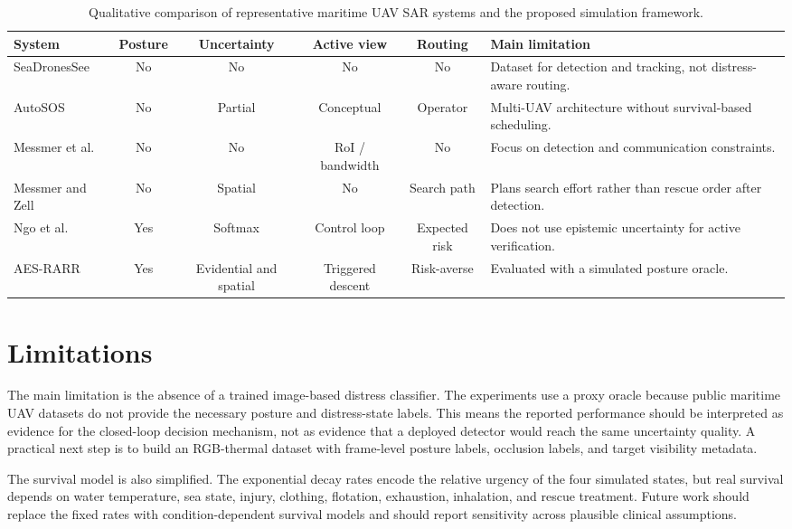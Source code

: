 \documentclass[runningheads]{llncs}
\newcommand{\aes}{AES-RARR}
\begin{document}
\begin{table}[p]
\centering
\caption{Qualitative comparison of representative maritime UAV SAR systems and the proposed simulation framework.}
\label{tab:comparison}
\scriptsize
\setlength{\tabcolsep}{2.5pt}
\renewcommand{\arraystretch}{1.05}
\begin{tabularx}{\textwidth}{p{2.15cm}CCCCY}
\toprule
\textbf{System} & \textbf{Posture} & \textbf{Uncertainty} & \textbf{Active view} & \textbf{Routing} & \textbf{Main limitation} \\
\midrule
SeaDronesSee \cite{varga2022seadronessee} & No & No & No & No & Dataset for detection and tracking, not distress-aware routing. \\
AutoSOS \cite{queralta2020} & No & Partial & Conceptual & Operator & Multi-UAV architecture without survival-based scheduling. \\
Messmer et al. \cite{messmer2024holistic} & No & No & RoI / bandwidth & No & Focus on detection and communication constraints. \\
Messmer and Zell \cite{messmer2024planning} & No & Spatial & No & Search path & Plans search effort rather than rescue order after detection. \\
Ngo et al. \cite{ngo2026drowning} & Yes & Softmax & Control loop & Expected risk & Does not use epistemic uncertainty for active verification. \\
\aes{} & Yes & Evidential and spatial & Triggered descent & Risk-averse & Evaluated with a simulated posture oracle. \\
\bottomrule
\end{tabularx}
\end{table}

\section{Limitations}

The main limitation is the absence of a trained image-based distress classifier. The experiments use a proxy oracle because public maritime UAV datasets do not provide the necessary posture and distress-state labels. This means the reported performance should be interpreted as evidence for the closed-loop decision mechanism, not as evidence that a deployed detector would reach the same uncertainty quality. A practical next step is to build an RGB-thermal dataset with frame-level posture labels, occlusion labels, and target visibility metadata.

The survival model is also simplified. The exponential decay rates encode the relative urgency of the four simulated states, but real survival depends on water temperature, sea state, injury, clothing, flotation, exhaustion, inhalation, and rescue treatment. Future work should replace the fixed rates with condition-dependent survival models and should report sensitivity across plausible clinical assumptions.
\end{document}
